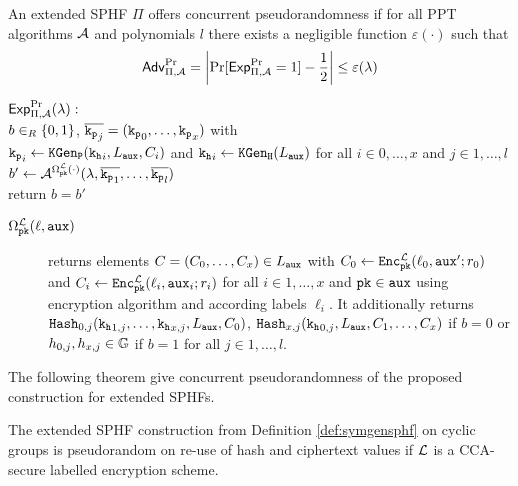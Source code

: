 \begin{definition}\label{def:prplusc}
An extended \ac{SPHF} $\Pi$ offers concurrent pseudorandomness if for all \ac{PPT} algorithms $\mathcal{A}$ and polynomials $l$ there exists a negligible function $\varepsilon(\cdot)$ such that
\[\mathsf{Adv}_{\Pi,\mathcal{A}}^{\Pr}=\left|\Pr[\mathsf{Exp}_{\Pi,\mathcal{A}}^{\Pr}=1] - \frac12 \right|\leq \varepsilon(\lambda)\]

\noindent
$\mathsf{Exp}_{\Pi,\mathcal{A}}^{\Pr}(\lambda):$ \\
\hspace*{2em} $b\in_R\{0,1\}$, $\overline{\mathtt{k_p}_j}=(\mathtt{k_p}_0,\dots,\mathtt{k_p}_x)$ with \\
\hspace*{2em} $\mathtt{k_p}_i\gets\mathtt{KGen_P}(\mathtt{k_h}_i,L_\mathtt{aux},C_i)$ and $\mathtt{k_h}_i\gets\mathtt{KGen_H}(L_\mathtt{aux})$ for all $i\in 0,\dots,x$ and $j\in 1,\dots,l$ \\
\hspace*{2em} $b'\gets\mathcal{A}^{\Omega^{\mathcal{L}}_\mathtt{pk}(\cdot)}(\lambda,\overline{\mathtt{k_p}_1},\dots,\overline{\mathtt{k_p}_l})$ \\
\hspace*{2em} return $b=b'$

\begin{description}
	\item[$\Omega^{\mathcal{L}}_\mathtt{pk}(\ell,\mathtt{aux})$] returns elements $C=(C_0,\dots,C_x)\in L_\mathtt{aux}$ with $C_0\gets\mathtt{Enc}^\mathcal{L}_\mathtt{pk}(\ell_0,\allowbreak\mathtt{aux}';r_0)$ and $C_i\gets\mathtt{Enc}^\mathcal{L}_\mathtt{pk}\allowbreak(\ell_i,\mathtt{aux}_i;r_i)$ for all $i\in1,\dots,x$ and $\mathtt{pk}\in\mathtt{aux}$ using encryption algorithm \cL and according labels $\ell_i$.
	It additionally returns $\mathtt{Hash}_{0,j}(\mathtt{k_h}_{1,j},\dots,\mathtt{k_h}_{x,j},L_\mathtt{aux},C_0)$, $\mathtt{Hash}_{x,j}(\mathtt{k_h}_{0,j},\allowbreak L_\mathtt{aux},C_1,\dots,C_x)$ if $b=0$ or $h_{0,j},\allowbreak h_{x,j}\in\mathbb{G}$ if $b=1$ for all $j\in 1,\dots, l$. \eod
\end{description}
\end{definition}

\noindent
The following theorem give concurrent pseudorandomness of the proposed construction for extended \acp{SPHF}.

\begin{lemma}\label{cor:pr}
The extended \ac{SPHF} construction from Definition \ref{def:symgensphf} on cyclic groups is pseudorandom on re-use of hash and ciphertext values if $\mathcal{L}$ is a \ac{CCA}-secure labelled encryption scheme.
\end{lemma}

